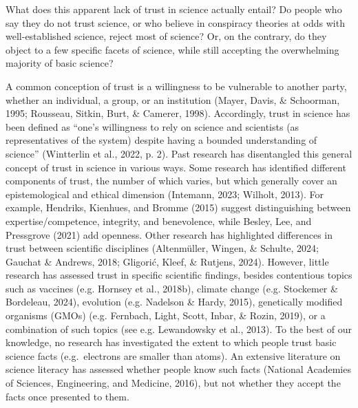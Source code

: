 \documentclass[
  doc,floatsintext]{apa6}
\begin{document}
What does this apparent lack of trust in science actually entail? Do people who say they do not trust science, or who believe in conspiracy theories at odds with well-established science, reject most of science? Or, on the contrary, do they object to a few specific facets of science, while still accepting the overwhelming majority of basic science?

A common conception of trust is a willingness to be vulnerable to another party, whether an individual, a group, or an institution (Mayer, Davis, \& Schoorman, 1995; Rousseau, Sitkin, Burt, \& Camerer, 1998). Accordingly, trust in science has been defined as ``one's willingness to rely on science and scientists (as representatives of the system) despite having a bounded understanding of science'' (Wintterlin et al., 2022, p. 2). Past research has disentangled this general concept of trust in science in various ways. Some research has identified different components of trust, the number of which varies, but which generally cover an epistemological and ethical dimension (Intemann, 2023; Wilholt, 2013). For example, Hendriks, Kienhues, and Bromme (2015) suggest distinguishing between expertise/competence, integrity, and benevolence, while Besley, Lee, and Pressgrove (2021) add openness. Other research has highlighted differences in trust between scientific disciplines (Altenmüller, Wingen, \& Schulte, 2024; Gauchat \& Andrews, 2018; Gligorić, Kleef, \& Rutjens, 2024). However, little research has assessed trust in specific scientific findings, besides contentious topics such as vaccines (e.g. Hornsey et al., 2018b), climate change (e.g. Stockemer \& Bordeleau, 2024), evolution (e.g. Nadelson \& Hardy, 2015), genetically modified organisms (GMOs) (e.g. Fernbach, Light, Scott, Inbar, \& Rozin, 2019), or a combination of such topics (see e.g. Lewandowsky et al., 2013). To the best of our knowledge, no research has investigated the extent to which people trust basic science facts (e.g.~electrons are smaller than atoms). An extensive literature on science literacy has assessed whether people know such facts (National Academies of Sciences, Engineering, and Medicine, 2016), but not whether they accept the facts once presented to them.
\end{document}
